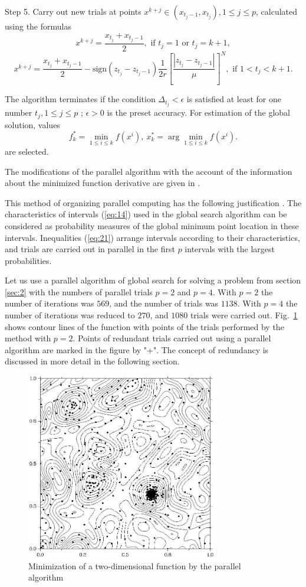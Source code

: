 \documentclass[smallcondensed]{svjour3}     %
\begin{document}
Step 5. Carry out new trials at points $x^{k+j}\in(x_{t_j-1},x_{t_j}), 1\leq j\leq p$, calculated using the formulas
\[
x^{k+j} = \frac{x_{t_j}+x_{t_j-1}}{2}, \textrm{ if } t_j=1 \textrm{ or } t_j=k+1,
\]
\[
x^{k+j} = \frac{x_{t_j}+x_{t_j-1}}{2} - \mathrm{sign}(z_{t_j}-z_{t_j-1})\frac{1}{2r}\left[\frac{\left|z_{t_j}-z_{t_j-1}\right|}{\mu}\right]^N, \textrm{ if } 1<t_j<k+1.
\]

The algorithm terminates if the condition $\Delta_{t_j}<\epsilon$ is satisfied at least for one number $t_j, 1 \leq j \leq p$ ; $\epsilon>0$ is the preset accuracy.  For estimation of the global solution, values
\[
f_k^\ast=\min_{1\leq i \leq k}f(x^i), \ x_k^\ast=\arg \min_{1\leq i \leq k}f(x^i).
\]
are selected.

The modifications of the parallel algorithm with the account of the information about the minimized function derivative are given in \cite{RefGergel1999}.

This method of organizing parallel computing has the following justification \cite{RefStrongin2000,RefGrishagin1997}. The characteristics of intervals (\ref{eq:14}) used in the global search algorithm can be considered as probability measures of the global minimum point location in these intervals. Inequalities (\ref{eq:21}) arrange intervals according to their characteristics, and trials are carried out in parallel in the first $p$ intervals with the largest probabilities.

Let us use a parallel algorithm of global search for solving a problem from section \ref{sec:2} with the numbers of parallel trials $p=2$ and $p=4$. With $p=2$ the number of iterations was $569$, and the number of trials was $1138$. With $p=4$ the number of iterations was reduced to $270$, and $1080$ trials were carried out. Fig.~\ref{fig:2} shows contour lines of the function with points of the trials performed by the method with $p=2$. Points of redundant trials carried out using a parallel algorithm are marked in the figure by "+". The concept of redundancy is discussed in more detail in the following section.
\begin{figure}
	\center
  \includegraphics[width=0.75\textwidth]{fig2.jpg} 
  \caption{Minimization of a two-dimensional function by the parallel algorithm}
  \label{fig:2}
\end{figure}
\end{document}
